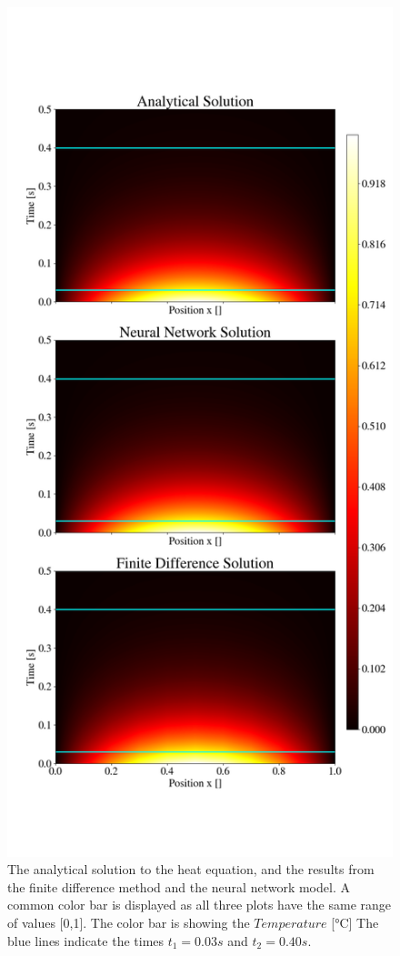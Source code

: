 \subsubsection{}
\begin{figure}[h!]
    \centering
    \includegraphics[width=1.0\linewidth]{project_3/plots/heat_map_comparison.png}
    \caption{The analytical solution to the heat equation, and the results from the finite difference method and the neural network model. A common color bar is displayed as all three plots have the same range of values [0,1]. The color bar is showing the $Temperature$ [°C] The blue lines indicate the times $t_1 = 0.03 s$ and $t_2 = 0.40 s$.}
    \label{fig:heatmaps}
\end{figure}

